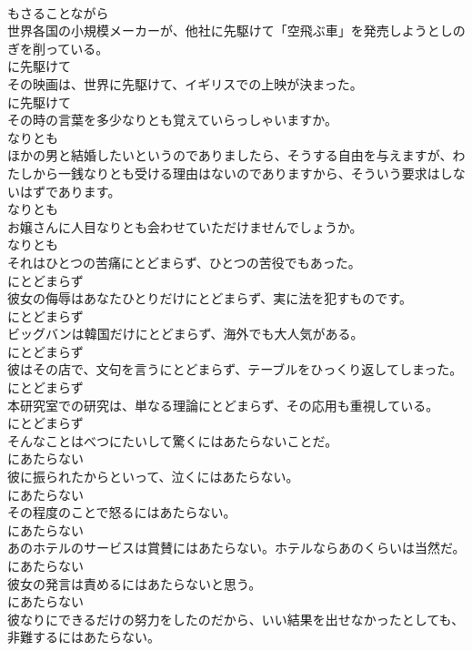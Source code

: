 \documentclass[8pt]{extreport}
\begin{document}
\begin{CJK}{UTF8}{min}
\\	もさることながら	
\\	世界各国の小規模メーカーが、他社に先駆けて「空飛ぶ車」を発売しようとしのぎを削っている。	
\\	に先駆けて	
\\	その映画は、世界に先駆けて、イギリスでの上映が決まった。	
\\	に先駆けて	
\\	その時の言葉を多少なりとも覚えていらっしゃいますか。	
\\	なりとも	
\\	ほかの男と結婚したいというのでありましたら、そうする自由を与えますが、わたしから一銭なりとも受ける理由はないのでありますから、そういう要求はしないはずであります。	
\\	なりとも	
\\	お嬢さんに人目なりとも会わせていただけませんでしょうか。	
\\	なりとも	
\\	それはひとつの苦痛にとどまらず、ひとつの苦役でもあった。	
\\	にとどまらず	
\\	彼女の侮辱はあなたひとりだけにとどまらず、実に法を犯すものです。	
\\	にとどまらず	
\\	ビッグバンは韓国だけにとどまらず、海外でも大人気がある。	
\\	にとどまらず	
\\	彼はその店で、文句を言うにとどまらず、テーブルをひっくり返してしまった。	
\\	にとどまらず	
\\	本研究室での研究は、単なる理論にとどまらず、その応用も重視している。	
\\	にとどまらず	
\\	そんなことはべつにたいして驚くにはあたらないことだ。	
\\	にあたらない	
\\	彼に振られたからといって、泣くにはあたらない。	
\\	にあたらない	
\\	その程度のことで怒るにはあたらない。	
\\	にあたらない	
\\	あのホテルのサービスは賞賛にはあたらない。ホテルならあのくらいは当然だ。	
\\	にあたらない	
\\	彼女の発言は責めるにはあたらないと思う。	
\\	にあたらない	
\\	彼なりにできるだけの努力をしたのだから、いい結果を出せなかったとしても、非難するにはあたらない。	

\end{CJK}
\end{document}

